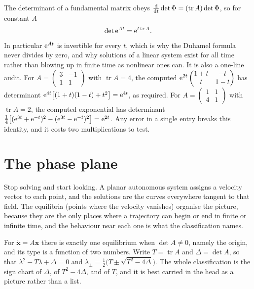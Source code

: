\begin{keynote}
The determinant of a fundamental matrix obeys $\frac{\mathrm{d}}{\mathrm{d}t}\det\Phi=(\operatorname{tr}A)\det\Phi$, so for constant $A$
\[\det\mathrm{e}^{At}=\mathrm{e}^{t\operatorname{tr}A}.\]
In particular $\mathrm{e}^{At}$ is invertible for every $t$, which is why the Duhamel formula never divides by zero, and why solutions of a linear system exist for all time rather than blowing up in finite time as nonlinear ones can. It is also a one-line audit. For $A=\begin{pmatrix}3&-1\\1&1\end{pmatrix}$ with $\operatorname{tr}A=4$, the computed $\mathrm{e}^{2t}\begin{pmatrix}1+t&-t\\t&1-t\end{pmatrix}$ has determinant $\mathrm{e}^{4t}\bigl[(1+t)(1-t)+t^{2}\bigr]=\mathrm{e}^{4t}$, as required. For $A=\begin{pmatrix}1&1\\4&1\end{pmatrix}$ with $\operatorname{tr}A=2$, the computed exponential has determinant $\tfrac14\bigl[(\mathrm{e}^{3t}+\mathrm{e}^{-t})^{2}-(\mathrm{e}^{3t}-\mathrm{e}^{-t})^{2}\bigr]=\mathrm{e}^{2t}$. Any error in a single entry breaks this identity, and it costs two multiplications to test.
\end{keynote}

\section{The phase plane}

Stop solving and start looking. A planar autonomous system assigns a velocity vector to each point, and the solutions are the curves everywhere tangent to that field. The equilibria (points where the velocity vanishes) organise the picture, because they are the only places where a trajectory can begin or end in finite or infinite time, and the behaviour near each one is what the classification names.

For $\dot{\mathbf{x}}=A\mathbf{x}$ there is exactly one equilibrium when $\det A\ne0$, namely the origin, and its type is a function of two numbers. Write $T=\operatorname{tr}A$ and $\Delta=\det A$, so that $\lambda^{2}-T\lambda+\Delta=0$ and $\lambda_{\pm}=\tfrac12\bigl(T\pm\sqrt{T^{2}-4\Delta}\bigr)$. The whole classification is the sign chart of $\Delta$, of $T^{2}-4\Delta$, and of $T$, and it is best carried in the head as a picture rather than a list.

